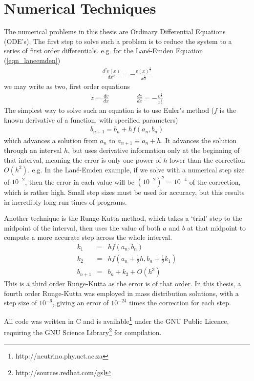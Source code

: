 \section{Numerical Techniques}
The numerical problems in this thesis are Ordinary Differential Equations (ODE's). The first step to solve such a problem is to reduce
the system to a series of first order differentials. e.g. for the Lan\'e-Emden Equation (\ref{eqn_laneemden})
\begin{eqnarray*}
	\frac{d^2v(x)}{dx^2} = -\frac{v(x)^\frac{3}{2}}{x^\frac{1}{2}}
\end{eqnarray*}
we may write as two, first order equations
\begin{eqnarray*}
	z = \frac{dv}{dx} \qquad \qquad \frac{dz}{dx} = -\frac{v^\frac{3}{2}}{x^\frac{1}{2}}
\end{eqnarray*}
The simplest way to solve such an equation is to use Euler's method ($f$ is the known derivative of a function, with specified parameters)
\begin{eqnarray*}
	b_{n+1}=b_n + h f\left(a_n, b_n\right)
\end{eqnarray*}
which advances a solution from $a_n$ to $a_{n+1} \equiv a_n + h$. It advances the solution through an interval $h$, but uses derivative
information only at the beginning of that interval, meaning the error is only one power of $h$ lower than the correction $O(h^2)$.
e.g. In the Lan\'e-Emden example, if we solve with a numerical step size of $10^{-2}$, then the error in each value will be
$(10^{-2})^2=10^{-4}$ of the correction, which is rather high. Small step sizes must be used for accuracy, but this results in
incredibly long run times of programs.

Another technique is the Runge-Kutta method, which takes a `trial' step to the midpoint of the interval, then uses the value of both $a$
and $b$ at that midpoint to compute a more accurate step across the whole interval.
\begin{eqnarray*}
	k_1 &=& h f\left(a_n, b_n\right) \\
	k_2 &=& h f\left(a_n + \frac{1}{2}h, b_n + \frac{1}{2} k_1\right) \\
	b_{n+1} &=& b_n + k_2 + O\left(h^3\right)
\end{eqnarray*}
This is a third order Runge-Kutta as the error is of that order. In this thesis, a fourth order Runge-Kutta was employed in mass
distribution solutions, with a step size of $10^{-6}$, giving an error of $10^{-24}$ times the correction for each step.

All code was written in C and is available\footnote{http://neutrino.phy.uct.ac.za} under the GNU Public Licence, requiring the
GNU Science Library\footnote{http://sources.redhat.com/gsl} for compilation.
